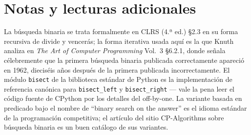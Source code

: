 \documentclass[11pt,a4paper]{article}
\begin{document}
\section{Notas y lecturas adicionales}

La búsqueda binaria se trata formalmente en CLRS (4.ª ed.) \S 2.3 en su forma recursiva de divide y vencerás; la forma iterativa usada aquí es la que Knuth analiza en \emph{The Art of Computer Programming} Vol.~3 \S 6.2.1, donde señala célebremente que la primera búsqueda binaria publicada correctamente apareció en 1962, dieciséis años después de la primera publicada incorrectamente. El módulo \texttt{bisect} de la biblioteca estándar de Python es la implementación de referencia canónica para \texttt{bisect\_left} y \texttt{bisect\_right} --- vale la pena leer el código fuente de CPython por los detalles del off-by-one. La variante basada en predicado bajo el nombre de ``binary search on the answer'' es el idioma estándar de la programación competitiva; el artículo del sitio CP-Algorithms sobre búsqueda binaria es un buen catálogo de sus variantes.
\end{document}
